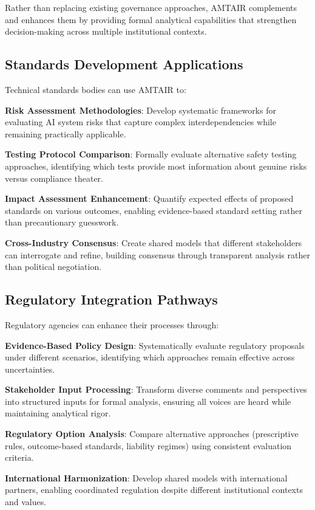 \documentclass[
  11pt,
  letterpaper,
]{book}
\begin{document}
Rather than replacing existing governance approaches, AMTAIR complements
and enhances them by providing formal analytical capabilities that
strengthen decision-making across multiple institutional contexts.

\subsection{Standards Development
Applications}\label{sec-standards-applications}

Technical standards bodies can use AMTAIR to:

\textbf{Risk Assessment Methodologies}: Develop systematic frameworks
for evaluating AI system risks that capture complex interdependencies
while remaining practically applicable.

\textbf{Testing Protocol Comparison}: Formally evaluate alternative
safety testing approaches, identifying which tests provide most
information about genuine risks versus compliance theater.

\textbf{Impact Assessment Enhancement}: Quantify expected effects of
proposed standards on various outcomes, enabling evidence-based standard
setting rather than precautionary guesswork.

\textbf{Cross-Industry Consensus}: Create shared models that different
stakeholders can interrogate and refine, building consensus through
transparent analysis rather than political negotiation.

\subsection{Regulatory Integration
Pathways}\label{sec-regulatory-integration}

Regulatory agencies can enhance their processes through:

\textbf{Evidence-Based Policy Design}: Systematically evaluate
regulatory proposals under different scenarios, identifying which
approaches remain effective across uncertainties.

\textbf{Stakeholder Input Processing}: Transform diverse comments and
perspectives into structured inputs for formal analysis, ensuring all
voices are heard while maintaining analytical rigor.

\textbf{Regulatory Option Analysis}: Compare alternative approaches
(prescriptive rules, outcome-based standards, liability regimes) using
consistent evaluation criteria.

\textbf{International Harmonization}: Develop shared models with
international partners, enabling coordinated regulation despite
different institutional contexts and values.
\end{document}
